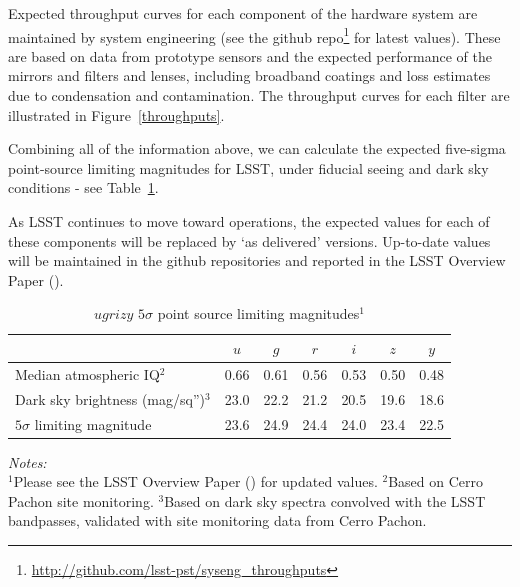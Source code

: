 \documentclass{iau}
\begin{document}
Expected throughput curves for each component of the hardware system
are maintained by system engineering (see the github
repo\footnote{\url{http://github.com/lsst-pst/syseng_throughputs}} for
latest values).  These are based on data from prototype sensors and
the expected performance of the mirrors and filters and lenses,
including broadband coatings and loss estimates due to condensation
and contamination. The throughput curves for each filter are
illustrated in Figure~\ref{throughputs}.

Combining all of the information above, we can calculate the
expected five-sigma point-source limiting magnitudes for LSST, under
fiducial seeing and dark sky conditions - see Table~\ref{table2}.

As LSST continues to move toward operations, the expected values for each
of these components will be replaced by `as delivered'
versions. Up-to-date values will be maintained in the github
repositories and reported in the LSST Overview Paper (\cite{lsstoverview}).

\begin{table}[tbh]
\begin{center}
\caption{$ugrizy$ $5\sigma$ point source limiting magnitudes$^1$}
\label{table2}
 {\scriptsize
  \begin{tabular}{|l|c|c|c|c|c|c|}\hline
 & $u$ & $g$ & $r$ & $i$ & $z$ & $y$ \\ \hline
Median atmospheric IQ$^2$  & 0.66 & 0.61 & 0.56 & 0.53 & 0.50 & 0.48 \\
    \hline
Dark sky brightness (mag/sq'')$^3$ & 23.0 & 22.2 &  21.2 & 20.5 & 19.6 & 18.6
    \\ \hline
$5\sigma$ limiting magnitude & 23.6 & 24.9 & 24.4 & 24.0 & 23.4 & 22.5
    \\ \hline
 \end{tabular}
  }
 \end{center}
\vspace{1mm}
 \scriptsize{
 {\it Notes:}\\
  $^1$Please see the LSST Overview Paper (\cite{lsstoverview}) for
  updated values.
  $^2$Based on Cerro Pachon site monitoring.
  $^3$Based on dark sky spectra convolved with the LSST bandpasses,
  validated with site monitoring data from Cerro Pachon.}
\end{table}
\end{document}
